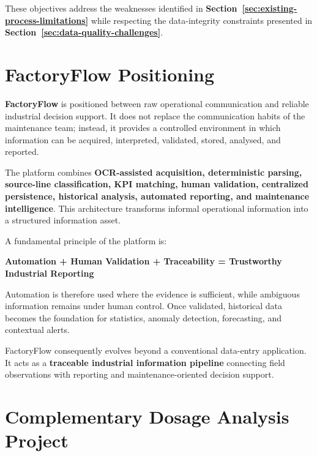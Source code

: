 These objectives address the weaknesses identified in \textbf{Section~\ref{sec:existing-process-limitations}} while respecting the data-integrity constraints presented in \textbf{Section~\ref{sec:data-quality-challenges}}.



\section{FactoryFlow Positioning}
\label{sec:factoryflow-positioning}

\textbf{FactoryFlow} is positioned between raw operational communication and reliable industrial decision support. It does not replace the communication habits of the maintenance team; instead, it provides a controlled environment in which information can be acquired, interpreted, validated, stored, analysed, and reported.

The platform combines \textbf{OCR-assisted acquisition, deterministic parsing, source-line classification, KPI matching, human validation, centralized persistence, historical analysis, automated reporting, and maintenance intelligence}. This architecture transforms informal operational information into a structured information asset.

A fundamental principle of the platform is:

\begin{center}
    \textbf{Automation + Human Validation + Traceability = Trustworthy Industrial Reporting}
\end{center}

Automation is therefore used where the evidence is sufficient, while ambiguous information remains under human control. Once validated, historical data becomes the foundation for statistics, anomaly detection, forecasting, and contextual alerts.

FactoryFlow consequently evolves beyond a conventional data-entry application. It acts as a \textbf{traceable industrial information pipeline} connecting field observations with reporting and maintenance-oriented decision support.



\section{Complementary Dosage Analysis Project}
\label{sec:complementary-dosage}

